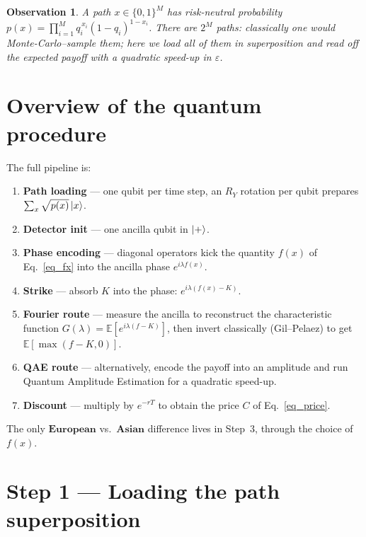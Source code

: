 \documentclass{article}
\newtheorem{remark}{Observation}
\begin{document}
\begin{remark}
A path $x\in\{0,1\}^M$ has risk-neutral probability $p(x)=\prod_{i=1}^M q_i^{\,x_i}(1-q_i)^{1-x_i}$. There are $2^M$ paths: classically one would Monte-Carlo--sample them; here we load \emph{all} of them in superposition and read off the expected payoff with a quadratic speed-up in $\varepsilon$.
\end{remark}


\section{Overview of the quantum procedure}

The full pipeline is:
\begin{enumerate}
    \item[\textbf{1.}] \textbf{Path loading} --- one qubit per time step, an $R_Y$ rotation per qubit prepares $\sum_x\sqrt{p(x)}\ket{x}$.
    \item[\textbf{2.}] \textbf{Detector init} --- one ancilla qubit in $\ket{+}$.
    \item[\textbf{3.}] \textbf{Phase encoding} --- diagonal operators kick the quantity $f(x)$ of Eq.~\eqref{eq_fx} into the ancilla phase $e^{i\lambda f(x)}$.
    \item[\textbf{4.}] \textbf{Strike} --- absorb $K$ into the phase: $e^{i\lambda(f(x)-K)}$.
    \item[\textbf{5a.}] \textbf{Fourier route} --- measure the ancilla to reconstruct the characteristic function $G(\lambda)=\mathbb{E}[e^{i\lambda(f-K)}]$, then invert classically (Gil--Pelaez) to get $\mathbb{E}[\max(f-K,0)]$.
    \item[\textbf{5b.}] \textbf{QAE route} --- alternatively, encode the payoff into an amplitude and run Quantum Amplitude Estimation for a quadratic speed-up.
    \item[\textbf{6.}] \textbf{Discount} --- multiply by $e^{-rT}$ to obtain the price $C$ of Eq.~\eqref{eq_price}.
\end{enumerate}
The only $\textbf{European}$ vs.\ $\textbf{Asian}$ difference lives in Step~3, through the choice of $f(x)$.


\section{Step 1 --- Loading the path superposition}
\end{document}
